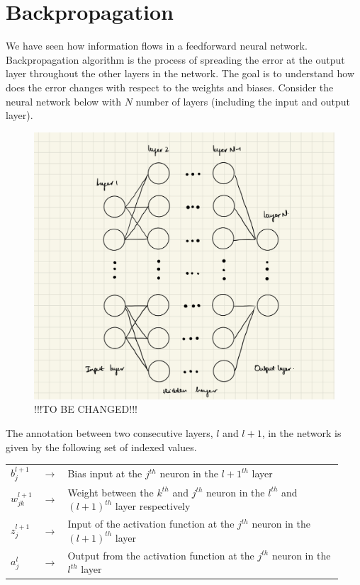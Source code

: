 \section{Backpropagation}
We have seen how information flows in a feedforward neural network. Backpropagation algorithm is the process of spreading the error at the output layer throughout the other layers in the network. The goal is to understand how does the error changes with respect to the weights and biases. Consider the neural network below with $N$ number of layers (including the input and output layer).\vspace{5mm}
\begin{figure}[H]
  \centering
  \includegraphics[scale=0.36]{CHAPTER_2/c2_bp_nn.jpeg}
  \caption{!!!TO BE CHANGED!!!}
  \label{fig:bp_nn_complete}
\end{figure}
\noindent The annotation between two consecutive layers, $l$ and $l+1$, in the network is given by the following set of indexed values.
\begin{center}
  \begin{tabular}{p{0.03\linewidth} p{0.03\linewidth} p{0.87\linewidth}}
    $b_j^{l+1}$ & $\rightarrow$ & Bias input at the $j^{th}$ neuron in the ${l+1}^{th}$ layer \\ 
    $w_{jk}^{l+1}$ & $\rightarrow$ & Weight between the $k^{th}$ and $j^{th}$ neuron in the $l^{th}$ and ${(l+1)}^{th}$ layer respectively \\  
    $z_j^{l+1}$ &$\rightarrow$& Input of the activation function at the $j^{th}$ neuron in the $(l+1)^{th}$ layer \\
    $a_j^l$ & $\rightarrow$ & Output from the activation function at the $j^{th}$ neuron in the $l^{th}$ layer
  \end{tabular}
\end{center}
